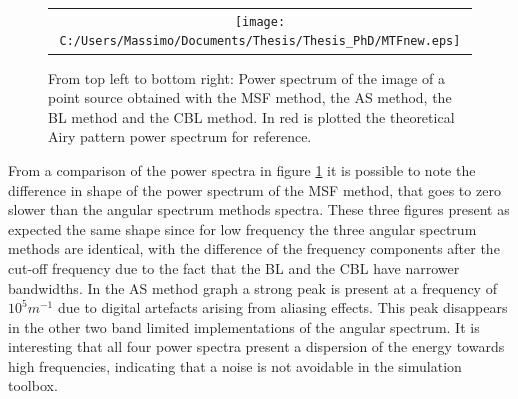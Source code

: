 	 \begin{figure}[h]
	 	\begin{center}
	 		\begin{tabular}{c}
	 			\texttt{[image: C:/Users/Massimo/Documents/Thesis/Thesis\_PhD/MTFnew.eps]}
	 		\end{tabular}
	 	\end{center}
	 	\caption{ \label{fig:resultspoint2} 
	 		From top left to bottom right: Power spectrum of the image of a point source obtained with the MSF method, the AS method, the BL method and the CBL method. In red is plotted the theoretical Airy pattern power spectrum for reference. }
	 \end{figure} 
	From a comparison of the power spectra in figure \ref{fig:resultspoint2} it is possible to note the difference in shape of the power spectrum of the MSF method, that goes to zero slower than the angular spectrum methods spectra. These three figures present as expected the same shape since for low frequency the three angular spectrum methods are identical, with the difference of the frequency components after the cut-off frequency due to the fact that the BL and the CBL have narrower bandwidths. In the AS method graph a strong peak is present at a frequency of $10^5 m^{-1}$ due to digital artefacts arising from aliasing effects. This peak disappears in the other two band limited implementations of the angular spectrum. 
	It is interesting that all four power spectra present a dispersion of the energy towards high frequencies, indicating that a noise is not avoidable in the simulation toolbox.
